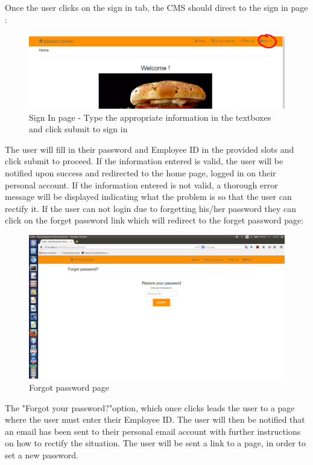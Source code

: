 \documentclass[a4paper,12pt]{report}
\begin{document}
Once the user clicks on the sign in tab, the CMS should direct to the sign in page :

\begin{figure}[H]
  \centering
    \includegraphics[width=1.0\textwidth]{screenshots/signIn.png}
    \caption{Sign In page - Type the appropriate information in the textboxes and click submit to sign in} 
\end{figure}
  
The user will fill in their password and Employee ID in the provided slots and click submit to proceed. If the information entered is valid, the user will be notified upon success and redirected to the home page, logged in on their personal account. If the information entered is not valid, a thorough error message will be displayed indicating what the problem is so that the user can rectify it.
If the user can not login due to forgetting his/her password they can click on the forget password link which will redirect to the forget password page:
 
\begin{figure}[H]
  \centering
    \includegraphics[width=1.0\textwidth]{screenshots/ForgotPass.png}
    \caption{Forgot password page} 
\end{figure}

The "Forgot your password?"option, which once clicks leads the user to a page where the user must enter their Employee ID. The user will then be notified that an email has been sent to their personal email account with further instructions on how to rectify the situation. The user will be sent a link to a page, in order to set a new password.    \\
\end{document}
